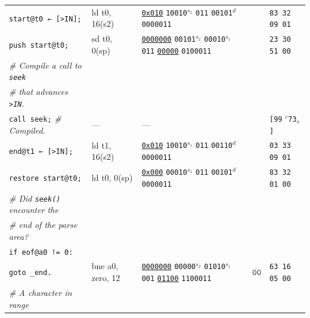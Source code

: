 \documentclass[a4paper,12pt,final]{article}
\begin{document}
\begin{table}[!htbp]
\begin{adjustwidth}{-1cm}{-1cm}
\begin{center}
\begin{tabular}{l|ll|l|l}
\hspace{1.053000em} \texttt{start@t0 ← [>IN];} & ld t0, 16(s2) & \uline{\texttt{0x010}}                    \texttt{10010}​\(^{s_{1}}\) \texttt{011} \texttt{00101}​\(^{d}\)  \texttt{0000011} &  & \texttt{83 32 09 01}\\[0pt]
\hspace{1.053000em} \texttt{push start@t0;} & sd t0, 0(sp) & \uline{\texttt{0000000}} \texttt{00101}​\(^{s_{2}}\) \texttt{00010}​\(^{s_{1}}\) \texttt{011} \uline{\texttt{00000}} \texttt{0100011} &  & \texttt{23 30 51 00}\\[0pt]
\hspace{1.053000em} \emph{\# Compile a call to \texttt{seek}} &  &  &  & \\[0pt]
\hspace{1.053000em} \emph{\# that advances \texttt{>IN}.} &  &  &  & \\[0pt]
\hspace{1.053000em} \texttt{call seek;}  \emph{\# Compiled.} & --- & --- &  & \texttt{[99} \(^{c}\)​\texttt{73}​\(_{s}\)​\texttt{]}\\[0pt]
\hspace{1.053000em} \texttt{end@t1 ← [>IN];} & ld t1, 16(s2) & \uline{\texttt{0x010}}                    \texttt{10010}​\(^{s_{1}}\) \texttt{011} \texttt{00110}​\(^{d}\)  \texttt{0000011} &  & \texttt{03 33 09 01}\\[0pt]
\hspace{1.053000em} \texttt{restore start@t0;} & ld t0, 0(sp) & \uline{\texttt{0x000}}                    \texttt{00010}​\(^{s_{1}}\) \texttt{011} \texttt{00101}​\(^{d}\)  \texttt{0000011} &  & \texttt{83 32 01 00}\\[0pt]
\hspace{1.053000em} \emph{\# Did \texttt{seek()} encounter the} &  &  &  & \\[0pt]
\hspace{1.053000em} \emph{\# end of the parse area?} &  &  &  & \\[0pt]
\hspace{1.053000em} \texttt{if eof@a0 != 0:} &  &  &  & \\[0pt]
\hspace{2.106000em}   \texttt{goto \_end.} & bne a0, zero, 12 & \uline{\texttt{0000000}} \texttt{00000}​\(^{s_{2}}\) \texttt{01010}​\(^{s_{1}}\) \texttt{001} \uline{\texttt{01100}} \texttt{1100011} & \(\overline{\texttt{00}}\) & \texttt{63 16 05 00}\\[0pt]
\hspace{1.053000em} \emph{\# A character in range} &  &  &  & \\[0pt]

\end{tabular}
\end{center}
\end{adjustwidth}
\end{table}
\end{document}
